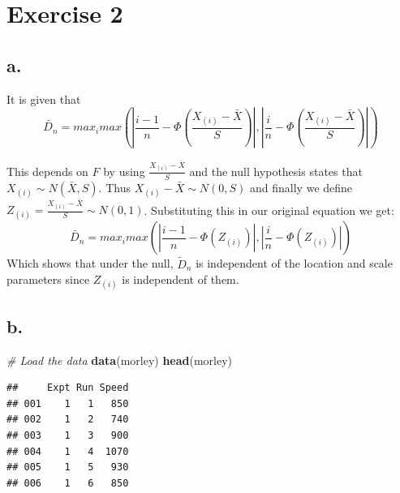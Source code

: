 \documentclass[
]{article}
\newenvironment{Shaded}{\begin{snugshade}}{\end{snugshade}}
\newcommand{\AttributeTok}[1]{\textcolor[rgb]{0.13,0.29,0.53}{#1}}
\newcommand{\CommentTok}[1]{\textcolor[rgb]{0.56,0.35,0.01}{\textit{#1}}}
\newcommand{\FunctionTok}[1]{\textcolor[rgb]{0.13,0.29,0.53}{\textbf{#1}}}
\newcommand{\NormalTok}[1]{#1}
\newcommand{\OtherTok}[1]{\textcolor[rgb]{0.56,0.35,0.01}{#1}}
\newcommand{\SpecialCharTok}[1]{\textcolor[rgb]{0.81,0.36,0.00}{\textbf{#1}}}
\newcommand{\StringTok}[1]{\textcolor[rgb]{0.31,0.60,0.02}{#1}}
\begin{document}
\section{Exercise 2}\label{exercise-2}

\subsection{a.}\label{a.-1}

It is given that
\[\tilde{D_n}=max_i max\left(\left| \frac{i-1}{n} - \Phi\left( \frac{X_{(i)}-\bar{X}}{S} \right)\right|, \left| \frac{i}{n} - \Phi\left(\frac{X_{(i)}-\bar{X}}{S}\right) \right|\right)\]

This depends on \(F\) by using \(\frac{X_{(i)}-\bar{X}}{S}\) and the
null hypothesis states that \(X_{(i)}\sim N(\bar{X},S)\). Thus
\(X_{(i)}-\bar{X}\sim N(0,S)\) and finally we define
\(Z_{(i)}=\frac{X_{(i)}-\bar{X}}{S}\sim N(0,1)\). Substituting this in
our original equation we get:
\[\tilde{D_n}=max_i max\left(\left| \frac{i-1}{n} - \Phi\left(Z_{(i)} \right)\right|, \left| \frac{i}{n} - \Phi\left(Z_{(i)}\right) \right|\right)\]
Which shows that under the null, \(\tilde{D}_n\) is independent of the
location and scale parameters since \(Z_{(i)}\) is independent of them.

\subsection{b.}\label{b.-1}

\begin{Shaded}
\begin{Highlighting}[]
\CommentTok{\# Load the data}
\FunctionTok{data}\NormalTok{(morley)}
\FunctionTok{head}\NormalTok{(morley)}
\end{Highlighting}
\end{Shaded}

\begin{verbatim}
##     Expt Run Speed
## 001    1   1   850
## 002    1   2   740
## 003    1   3   900
## 004    1   4  1070
## 005    1   5   930
## 006    1   6   850
\end{verbatim}

\begin{Shaded}
\end{Shaded}
\end{document}
